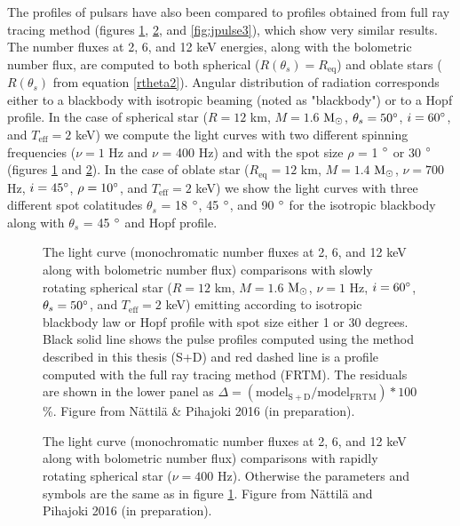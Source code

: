 \documentclass{wihuri}
\def\msun{{\rm M_{\odot}}}
\def\thetas{\theta_{s}}
\begin{document}
The profiles of pulsars have also been compared to profiles obtained from full ray tracing method (figures \ref{fig:jpulse1}, \ref{fig:jpulse2}, and \ref{fig:jpulse3}), which show very similar results. %
The number fluxes at 2, 6, and 12 keV energies, along with the bolometric number flux, are computed to both spherical ($R(\thetas) = R_{\mathrm{eq}}$) and oblate stars ($R(\thetas)$ from equation \ref{rtheta2}). Angular distribution of radiation corresponds either to a blackbody with isotropic beaming (noted as "blackbody") or to a Hopf profile. %
In the case of spherical star ($R = 12$ km, $M = 1.6$ $\msun$, $\thetas = 50 \degree$, $i = 60 \degree$, and $T_{\mathrm{eff}} = 2$ keV) we compute the light curves with two different spinning frequencies ($\nu = 1$ Hz and $\nu$ = 400 Hz) and with the spot size $\rho$ = 1 $\degree$ or 30 $\degree$ (figures \ref{fig:jpulse1} and \ref{fig:jpulse2}). In the case of oblate star ($R_{\mathrm{eq}} = 12$ km, $M = 1.4$ $\msun$, $\nu = 700$ Hz, $i = 45 \degree$, $\rho = 10 \degree$, and $T_{\mathrm{eff}} = 2$ keV) we show the light curves with three different spot colatitudes $\thetas$  = 18 $\degree$, 45 $\degree$, and 90 $\degree$ for the isotropic blackbody along with $\thetas$  = 45 $\degree$ and Hopf profile.





\begin{figure}
\centerline{}
\caption{The light curve (monochromatic number fluxes at 2, 6, and 12 keV along with bolometric number flux) comparisons with slowly rotating spherical star ($R = 12$ km, $M = 1.6$ $\msun$, $\nu = 1$ Hz, $i = 60 \degree$, $\thetas = 50 \degree$, and $T_{\mathrm{eff}} = 2$ keV) emitting according to isotropic blackbody law or Hopf profile with spot size either 1 or 30 degrees. Black solid line shows the pulse profiles computed using the method described in this thesis (S+D) and red dashed line is a profile computed with the full ray tracing method (FRTM). The residuals are shown in the lower panel as $\Delta = (\mathrm{model}_{\mathrm{S+D}}/\mathrm{model}_{\mathrm{FRTM}})*100$ \%. Figure from Nättilä \& Pihajoki 2016 (in preparation).
\label{fig:jpulse1}}
\end{figure}


\begin{figure}
\centerline{}
\caption{The light curve (monochromatic number fluxes at 2, 6, and 12 keV along with bolometric number flux) comparisons with rapidly rotating spherical star ($\nu = 400$ Hz). Otherwise the parameters and symbols are the same as in figure \ref{fig:jpulse1}. Figure from Nättilä and Pihajoki 2016 (in preparation).
\label{fig:jpulse2}}
\end{figure}
\end{document}

